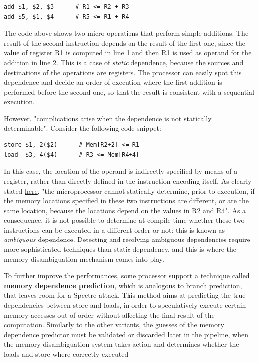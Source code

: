 \documentclass[12pt,a4paper]{book}
\theoremstyle{definition}
\begin{document}
	\vspace{3mm}
	\begin{minipage}{.5\textwidth}
	\begin{lstlisting}
add $1, $2, $3      # R1 <= R2 + R3
add $5, $1, $4      # R5 <= R1 + R4
	\end{lstlisting}
	\end{minipage}
	
	The code above shows two micro-operations that perform simple additions. The result of the second instruction depends on the result of the first one, since the value of register R1 is computed in line 1 and then R1 is used as operand for the addition in line 2. This is a case of \textit{static} dependence, because the sources and destinations of the operations are registers. The processor can easily spot this dependence and decide an order of execution where the first addition is performed before the second one, so that the result is consistent with a sequential execution.
	
	However, "complications arise when the dependence is not statically determinable". Consider the following code snippet:
	
	\vspace{3mm}
	\begin{minipage}{.5\textwidth}
	\begin{lstlisting}
store $1, 2($2)      # Mem[R2+2] <= R1
load  $3, 4($4)      # R3 <= Mem[R4+4]
	\end{lstlisting}
	\end{minipage}

	In this case, the location of the operand is indirectly specified by means of a register, rather than directly defined in the instruction encoding itself. As clearly stated \href{https://en.wikipedia.org/wiki/Memory_disambiguation}{here}, "the microprocessor cannot statically determine, prior to execution, if the memory locations specified in these two instructions are different, or are the same location, because the locations depend on the values in R2 and R4". As a consequence, it is not possible to determine at compile time whether these two instructions can be executed in a different order or not: this is known as \textit{ambiguous} dependence. Detecting and resolving ambiguous dependencies require more sophisticated techniques than static dependency, and this is where the memory disambiguation mechanism comes into play.
	
	To further improve the performances, some processor support a technique called \textbf{memory dependence prediction}, which is analogous to branch prediction, that leaves room for a Spectre attack. This method aims at predicting the true dependencies between store and loads, in order to speculatively execute certain memory accesses out of order without affecting the final result of the computation. Similarly to the other variants, the guesses of the memory dependence predictor must be validated or discarded later in the pipeline, when the memory disambiguation system takes action and determines whether the loads and store where correctly executed.
\end{document}
